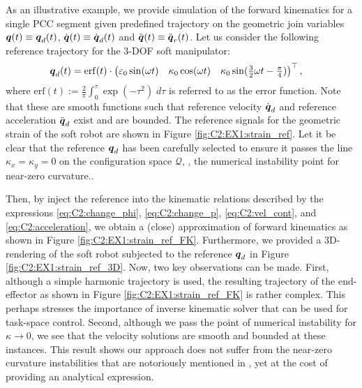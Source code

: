 \newpage
\begin{example}
As an illustrative example, we provide simulation of the forward kinematics for a single PCC segment given predefined trajectory on the geometric join variables ${\boldsymbol{q}}(t) \equiv {\boldsymbol{q}}_d(t)$, $\dot{{\boldsymbol{q}}}(t) \equiv \dot{{\boldsymbol{q}}}_d(t)$ and $\ddot{{\boldsymbol{q}}}(t) \equiv \ddot{{\boldsymbol{q}}}_r(t)$. Let us consider the following reference trajectory for the 3-DOF soft manipulator:
%
\begin{align*}
{\boldsymbol{q}}_d(t) &  =  \textup{\textrm{erf}}(t) \cdot \begin{pmatrix} \varepsilon_0 \sin(\omega t) & \kappa_0 \cos(\omega t) & \kappa_0 \sin(\tfrac{3}{2}\omega t - \tfrac{\pi}{4}) \end{pmatrix}^\top,
\end{align*}
%
where $\textrm{erf}(t) := \frac{2}{\pi}\int_0^\tau \exp(-\tau^2) \; d\tau$ is referred to as the error function. Note that these are smooth functions such that reference velocity ${\dot{\boldsymbol{q}}}_d$ and reference acceleration ${\ddot{\boldsymbol{q}}}_d$ exist and are bounded. The reference signals for the geometric strain of the soft robot are shown in Figure \ref{fig:C2:EX1:strain_ref}. Let it be clear that the reference ${\boldsymbol{q}}_d$ has been carefully selected to ensure it passes the line $\kappa_x = \kappa_y = 0$ on the configuration space
$\mathcal{Q}$, \ie, the numerical instability point for near-zero curvature..

Then, by inject the reference into the kinematic relations described by the expressions \eqref{eq:C2:change_phi}, \eqref{eq:C2:change_p}, \eqref{eq:C2:vel_cont}, and \eqref{eq:C2:acceleration}, we obtain a (close) approximation of forward kinematics as shown in Figure
\ref{fig:C2:EX1:strain_ref_FK}. Furthermore, we provided a 3D-rendering of the soft robot subjected to the reference ${\boldsymbol{q}}_d$ in Figure \ref{fig:C2:EX1:strain_ref_3D}. Now, two key observations can be made. First, although a simple harmonic trajectory is used, the resulting trajectory of the end-effector as shown in Figure \ref{fig:C2:EX1:strain_ref_FK} is rather complex. This perhaps stresses the importance of inverse kinematic solver that can be used for task-space control. Second, although we pass the point of numerical instability for
$\kappa \to 0$, we see that the velocity solutions are smooth and bounded at these instances. This result shows our approach does not suffer from the near-zero curvature instabilities that are notoriously mentioned in \cite{Falkenhahn2015,DellaSantina2020}, yet at the cost of providing an analytical expression.
\end{example}

